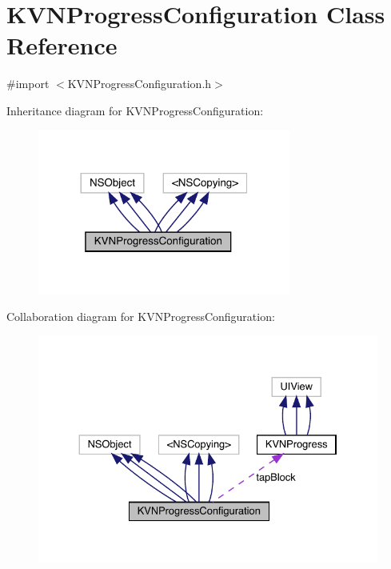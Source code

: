 \hypertarget{interface_k_v_n_progress_configuration}{}\section{K\+V\+N\+Progress\+Configuration Class Reference}
\label{interface_k_v_n_progress_configuration}


{\ttfamily \#import $<$K\+V\+N\+Progress\+Configuration.\+h$>$}



Inheritance diagram for K\+V\+N\+Progress\+Configuration\+:\nopagebreak
\begin{figure}[H]
\begin{center}
\leavevmode
\includegraphics[width=236pt]{interface_k_v_n_progress_configuration__inherit__graph}
\end{center}
\end{figure}


Collaboration diagram for K\+V\+N\+Progress\+Configuration\+:\nopagebreak
\begin{figure}[H]
\begin{center}
\leavevmode
\includegraphics[width=330pt]{interface_k_v_n_progress_configuration__coll__graph}
\end{center}
\end{figure}
